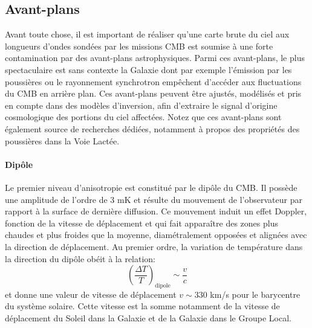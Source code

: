 \subsection{Avant-plans}

Avant toute chose, il est important de réaliser qu'une carte brute du ciel aux longueurs d'ondes sondées par les missions CMB est soumise à une forte contamination par des avant-plans astrophysiques. Parmi ces avant-plans, le plus spectaculaire est sans contexte la Galaxie dont par exemple l'émission  par les poussières ou le rayonnement synchrotron empêchent d'accéder aux fluctuations du CMB en arrière plan. Ces avant-plans peuvent être ajustés, modélisés et pris en compte dans des modèles d'inversion, afin d'extraire le signal d'origine cosmologique des portions du ciel affectées. Notez que ces avant-plans sont également source de recherches dédiées, notamment à propos des propriétés des poussières dans la Voie Lactée.

\paragraph{Dipôle} Le premier niveau d'anisotropie est constitué par le dipôle du CMB. Il possède une amplitude de l'ordre de 3 mK et résulte du mouvement de l'observateur par rapport à la surface de dernière diffusion. Ce mouvement induit un effet Doppler, fonction de la vitesse de déplacement et qui fait apparaître des zones plus chaudes et plus froides que la moyenne, diamétralement opposées et alignées avec la direction de déplacement. Au premier ordre, la variation de température dans la direction du dipôle obéit à la relation:
\begin{equation}
\left(\frac{\Delta T}{T}\right)_\mathrm{dipole}\sim \frac{v}{c}
\end{equation}
et donne une valeur de vitesse de déplacement $v\sim 330$ km/s pour le barycentre du système solaire. Cette vitesse est la somme notamment de la vitesse de déplacement du Soleil dans la Galaxie et de la Galaxie dans le Groupe Local.

